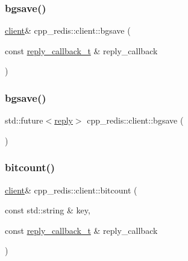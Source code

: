 \mbox{\label{classcpp__redis_1_1client_a102a4f3572072a5bc26681082ad16a2b}} 
\subsubsection{\texorpdfstring{bgsave()}{bgsave()}\hspace{0.1cm}{\footnotesize\ttfamily [1/2]}}
{\footnotesize\ttfamily \hyperlink{classcpp__redis_1_1client}{client}\& cpp\+\_\+redis\+::client\+::bgsave (\begin{DoxyParamCaption}\item[{const \hyperlink{classcpp__redis_1_1client_a061a1140d36d2eaeda82b09a0bb3f9f2}{reply\+\_\+callback\+\_\+t} \&}]{reply\+\_\+callback }\end{DoxyParamCaption})}

\mbox{\label{classcpp__redis_1_1client_a632ef40c52f46eb4948768006adfead5}} 
\subsubsection{\texorpdfstring{bgsave()}{bgsave()}\hspace{0.1cm}{\footnotesize\ttfamily [2/2]}}
{\footnotesize\ttfamily std\+::future$<$\hyperlink{classcpp__redis_1_1reply}{reply}$>$ cpp\+\_\+redis\+::client\+::bgsave (\begin{DoxyParamCaption}{ }\end{DoxyParamCaption})}

\mbox{\label{classcpp__redis_1_1client_aa6c9c15d8676a1cee3d8409ab898a049}} 
\subsubsection{\texorpdfstring{bitcount()}{bitcount()}\hspace{0.1cm}{\footnotesize\ttfamily [1/4]}}
{\footnotesize\ttfamily \hyperlink{classcpp__redis_1_1client}{client}\& cpp\+\_\+redis\+::client\+::bitcount (\begin{DoxyParamCaption}\item[{const std\+::string \&}]{key,  }\item[{const \hyperlink{classcpp__redis_1_1client_a061a1140d36d2eaeda82b09a0bb3f9f2}{reply\+\_\+callback\+\_\+t} \&}]{reply\+\_\+callback }\end{DoxyParamCaption})}

